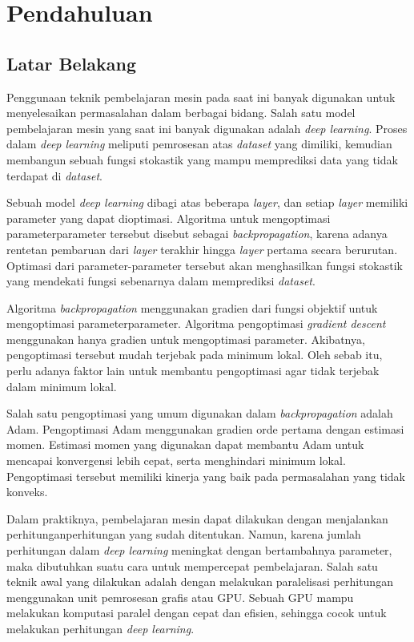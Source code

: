 \chapter{Pendahuluan}

\section{Latar Belakang}
\label{sec:latarbelakang}

Penggunaan teknik pembelajaran mesin pada saat ini banyak digunakan untuk menyelesaikan permasalahan dalam berbagai bidang. Salah satu model pembelajaran mesin yang saat ini banyak digunakan adalah \emph{deep learning}. Proses dalam \emph{deep learning} meliputi pemrosesan atas \emph{dataset} yang dimiliki, kemudian membangun sebuah fungsi stokastik yang mampu memprediksi data yang tidak terdapat di \emph{dataset}.

Sebuah model \emph{deep learning} dibagi atas beberapa \emph{layer}, dan setiap \emph{layer} memiliki parameter yang dapat dioptimasi. Algoritma untuk mengoptimasi parameter\+parameter tersebut disebut sebagai \emph{backpropagation}, karena adanya rentetan pembaruan dari \emph{layer} terakhir hingga \emph{layer} pertama secara berurutan. Optimasi dari parameter-parameter tersebut akan menghasilkan fungsi stokastik yang mendekati fungsi sebenarnya dalam memprediksi \emph{dataset}.

Algoritma \emph{backpropagation} menggunakan gradien dari fungsi objektif untuk mengoptimasi parameter\+parameter. Algoritma pengoptimasi \emph{gradient descent} menggunakan hanya gradien untuk mengoptimasi parameter. Akibatnya, pengoptimasi tersebut mudah terjebak pada minimum lokal. Oleh sebab itu, perlu adanya faktor lain untuk membantu pengoptimasi agar tidak terjebak dalam minimum lokal.

Salah satu pengoptimasi yang umum digunakan dalam \emph{backpropagation} adalah Adam. Pengoptimasi Adam menggunakan gradien orde pertama dengan estimasi momen. Estimasi momen yang digunakan dapat membantu Adam untuk mencapai konvergensi lebih cepat, serta menghindari minimum lokal. Pengoptimasi tersebut memiliki kinerja yang baik pada permasalahan yang tidak konveks.

Dalam praktiknya, pembelajaran mesin dapat dilakukan dengan menjalankan perhitungan\+perhitungan yang sudah ditentukan. Namun, karena jumlah perhitungan dalam \emph{deep learning} meningkat dengan bertambahnya parameter, maka dibutuhkan suatu cara untuk mempercepat pembelajaran. Salah satu teknik awal yang dilakukan adalah dengan melakukan paralelisasi perhitungan menggunakan unit pemrosesan grafis atau GPU. Sebuah GPU mampu melakukan komputasi paralel dengan cepat dan efisien, sehingga cocok untuk melakukan perhitungan \emph{deep learning}.

